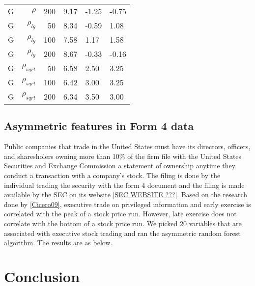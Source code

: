 \begin{table}
\begin{tabular}{rrrp{2.5cm}p{2.5cm}p{2.5cm}}
G     & $\rho$ & 200   & 9.17  & -1.25 & -0.75 \\
G     & $\rho_{lg}$ & 50    & 8.34  & -0.59 & 1.08 \\
G     & $\rho_{lg}$ & 100   & 7.58  & 1.17  & 1.58 \\
G     & $\rho_{lg}$ & 200   & 8.67  & -0.33 & -0.16 \\
G     & $\rho_{sqrt}$ & 50    & 6.58  & 2.50  & 3.25 \\
G     & $\rho_{sqrt}$ & 100   & 6.42  & 3.00  & 3.25 \\
G     & $\rho_{sqrt}$ & 200   & 6.34  & 3.50  & 3.00 \bigstrut[b]\\
\hline
\end{tabular}%
\label{tab:asymmetricfeaturesresults2}%
\end{table}%


\subsection{Asymmetric features in Form 4 data}
Public companies that trade in the United States must have its directors, officers, and sharesholers owning more than 10\% of the firm file with the United States Securities and Exchange Commission a statement of ownership anytime they conduct a transaction with a company's stock. The filing is done by the individual trading the security with the form 4 document and the filing is made available by the SEC on its website \ref{SEC WEBSITE ???}. Based on the research done by \ref{Cicero09}, executive trade on privileged information and early exercise is correlated with the peak of a stock price run. However, late exercise does not correlate with the bottom of a stock price run. We picked 20 variables that are associated with executive stock trading and ran the asymmetric random forest algorithm. The results are as below.  



\section{Conclusion}







